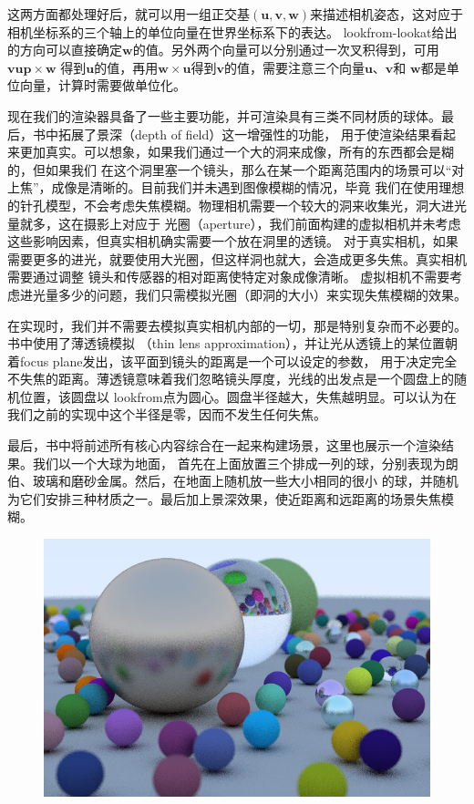 \documentclass[12pt]{article}
\begin{document}
\indent{}这两方面都处理好后，就可以用一组正交基$(\mathbf{u}, \mathbf{v}, \mathbf{w})$来描述相机姿态，这对应于
相机坐标系的三个轴上的单位向量在世界坐标系下的表达。
lookfrom-lookat给出的方向可以直接确定$\mathbf{w}$的值。另外两个向量可以分别通过一次叉积得到，可用$\mathbf{vup}\times\mathbf{w}$
得到$\mathbf{u}$的值，再用$\mathbf{w}\times\mathbf{u}$得到$\mathbf{v}$的值，需要注意三个向量$\mathbf{u}$、$\mathbf{v}$和
$\mathbf{w}$都是单位向量，计算时需要做单位化。

\indent{}现在我们的渲染器具备了一些主要功能，并可渲染具有三类不同材质的球体。最后，书中拓展了景深（depth of field）这一增强性的功能，
用于使渲染结果看起来更加真实。可以想象，如果我们通过一个大的洞来成像，所有的东西都会是糊的，但如果我们
在这个洞里塞一个镜头，那么在某一个距离范围内的场景可以“对上焦”，成像是清晰的。目前我们并未遇到图像模糊的情况，毕竟
我们在使用理想的针孔模型，不会考虑失焦模糊。物理相机需要一个较大的洞来收集光，洞大进光量就多，这在摄影上对应于
光圈（aperture），我们前面构建的虚拟相机并未考虑这些影响因素，但真实相机确实需要一个放在洞里的透镜。
对于真实相机，如果需要更多的进光，就要使用大光圈，但这样洞也就大，会造成更多失焦。真实相机需要通过调整
镜头和传感器的相对距离使特定对象成像清晰。
虚拟相机不需要考虑进光量多少的问题，我们只需模拟光圈（即洞的大小）来实现失焦模糊的效果。

\indent{}在实现时，我们并不需要去模拟真实相机内部的一切，那是特别复杂而不必要的。书中使用了薄透镜模拟
（thin lens approximation），并让光从透镜上的某位置朝着focus plane发出，该平面到镜头的距离是一个可以设定的参数，
用于决定完全不失焦的距离。薄透镜意味着我们忽略镜头厚度，光线的出发点是一个圆盘上的随机位置，该圆盘以
lookfrom点为圆心。圆盘半径越大，失焦越明显。可以认为在我们之前的实现中这个半径是零，因而不发生任何失焦。

\indent{}最后，书中将前述所有核心内容综合在一起来构建场景，这里也展示一个渲染结果。我们以一个大球为地面，
首先在上面放置三个排成一列的球，分别表现为朗伯、玻璃和磨砂金属。然后，在地面上随机放一些大小相同的很小
的球，并随机为它们安排三种材质之一。最后加上景深效果，使近距离和远距离的场景失焦模糊。
\begin{figure}[h]
\centering
\includegraphics[width=\textwidth]{./imgs/balls.jpg}
\end{figure}
\end{document}

